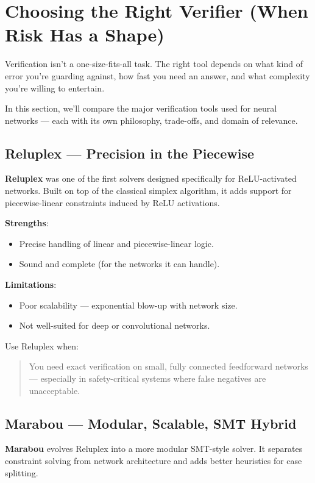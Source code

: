 \section{Choosing the Right Verifier (When Risk Has a Shape)}

Verification isn’t a one-size-fits-all task. The right tool depends on what kind of error you're guarding against, how fast you need an answer, and what complexity you're willing to entertain.

In this section, we’ll compare the major verification tools used for neural networks — each with its own philosophy, trade-offs, and domain of relevance.

\subsection{Reluplex — Precision in the Piecewise}

\textbf{Reluplex} was one of the first solvers designed specifically for ReLU-activated networks. Built on top of the classical simplex algorithm, it adds support for piecewise-linear constraints induced by ReLU activations.

\textbf{Strengths}:
\begin{itemize}
  \item Precise handling of linear and piecewise-linear logic.
  \item Sound and complete (for the networks it can handle).
\end{itemize}

\textbf{Limitations}:
\begin{itemize}
  \item Poor scalability — exponential blow-up with network size.
  \item Not well-suited for deep or convolutional networks.
\end{itemize}

Use Reluplex when:
\begin{quote}
You need exact verification on small, fully connected feedforward networks — especially in safety-critical systems where false negatives are unacceptable.
\end{quote}

\subsection{Marabou — Modular, Scalable, SMT Hybrid}

\textbf{Marabou} evolves Reluplex into a more modular SMT-style solver. It separates constraint solving from network architecture and adds better heuristics for case splitting.

